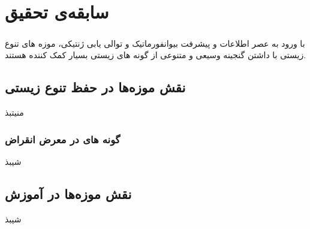
\chapter{سابقه‌ی تحقیق} \label{chapter:related-works}

\paragraph*{}

با ورود به عصر اطلاعات و پیشرفت بیوانفورماتیک و توالی یابی ژنتیکی، موزه های تنوع زیستی با داشتن گنجینه وسیعی و متنوعی از گونه های زیستی بسیار کمک کننده هستند.

\section{نقش موزه‌ها در حفظ تنوع زیستی}
منیتبذ
\subsection{گونه های در معرض انقراض}
شیبذ

\section{نقش موزه‌ها در آموزش}
شیبذ

